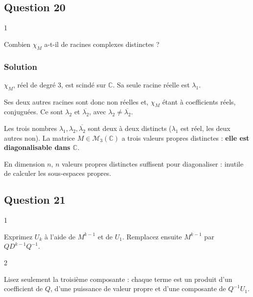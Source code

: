 \documentclass[11pt,a4paper]{article}
\begin{document}
\hypertarget{question-20}{%
\subsection{Question 20}\label{question-20}}

\begin{indication}{1}

Combien \(\chi_M\) a-t-il de racines complexes distinctes ?

\end{indication}

\hypertarget{solution-19}{%
\subsubsection{Solution}\label{solution-19}}

\(\chi_M\), réel de degré 3, est scindé sur \(\mathbb{C}\). Sa seule racine réelle est \(\lambda_1\).

Ses deux autres racines sont donc non réelles et, \(\chi_M\) étant à coefficients réels, conjuguées. Ce sont \(\lambda_2\) et \(\overline{\lambda_2}\), avec \(\lambda_2\neq\overline{\lambda_2}\).

Les trois nombres \(\lambda_1,\lambda_2,\overline{\lambda_2}\) sont deux à deux distincts (\(\lambda_1\) est réel, les deux autres non). La matrice \(M\in{\mathcal{M}}_3(\mathbb{C})\) a trois valeurs propres distinctes : \textbf{elle est diagonalisable dans \(\mathbb{C}\)}.

\begin{methode}

En dimension \(n\), \(n\) valeurs propres distinctes suffisent pour diagonaliser : inutile de calculer les sous-espaces propres.

\end{methode}

\hypertarget{question-21}{%
\subsection{Question 21}\label{question-21}}

\begin{indication}{1}

Exprimez \(U_k\) à l'aide de \(M^{k-1}\) et de \(U_1\). Remplacez ensuite \(M^{k-1}\) par \(QD^{k-1}Q^{-1}\).

\end{indication}

\begin{indication}{2}

Lisez seulement la troisième composante : chaque terme est un produit d'un coefficient de \(Q\), d'une puissance de valeur propre et d'une composante de \(Q^{-1}U_1\).

\end{indication}
\end{document}
